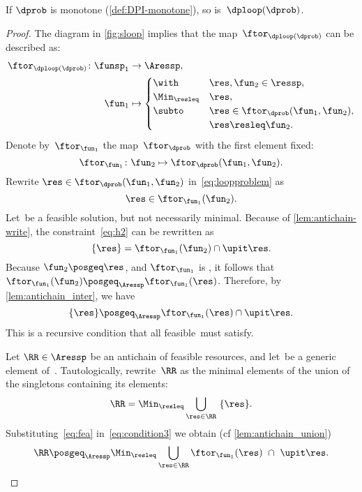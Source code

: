 \begin{proposition}
  \label{pro:loop-continuous}If $\dprob$ is monotone (\cref{def:DPI-monotone}),
  so is~$\dploop(\dprob)$.
\end{proposition}
\begin{proof}
  The diagram in \cref{fig:sloop} implies that the map~$\ftor_{\dploop(\dprob)}$
  can be described as:
  \begin{align}
    \ftor_{\dploop(\dprob)}\colon\funsp_{1} & \rightarrow\Aressp,\label{eq:loopproblem}\\
    \fun_{1} & \mapsto\begin{cases}
                        \with & \res,\fun_{2}\in\ressp,\\
                        \Min_{\resleq} & \res,\\
                        \subto & \res\in\ftor_{\dprob}(\fun_{1},\fun_{2}),\\
                        & \res\resleq\fun_{2}.
    \end{cases}
  \end{align}
  Denote by~$\ftor_{\fun_{1}}$ the map~$\ftor_{\dprob}$ with the
  first element fixed:
  \[
    \ftor_{\fun_{1}}\colon\fun_{2}\mapsto\ftor_{\dprob}(\fun_{1},\fun_{2}).
  \]
  Rewrite $\res\in\ftor_{\dprob}(\fun_{1},\fun_{2})$ in~\cref{eq:loopproblem}
  as
  \begin{equation}
    \res\in\ftor_{\fun_{1}}(\fun_{2}).\label{eq:h2}
  \end{equation}
  Let~\res be a feasible solution, but not necessarily minimal.
  Because of \cref{lem:antichain-write}, the constraint~\cref{eq:h2} can
  be rewritten as
  \begin{equation}
    \{\res\}=\ftor_{\fun_{1}}(\fun_{2})\cap\upit\res.\label{eq:h3}
  \end{equation}
  Because $\fun_{2}\posgeq\res$, and $\ftor_{\fun_{1}}$ is \scottcontinuous,
  it follows that~$\ftor_{\fun_{1}}(\fun_{2})\posgeq_{\Aressp}\ftor_{\fun_{1}}(\res)$.
  Therefore, by \cref{lem:antichain_inter}, we have
  \begin{equation}
    \{\res\}\posgeq_{\Aressp}\ftor_{\fun_{1}}(\res)\cap\upit\res.\label{eq:fea}
  \end{equation}
  This is a recursive condition that all feasible~\res must satisfy.

  Let $\RR\in\Aressp$ be an antichain of feasible resources, and
  let~\res be a generic element of~\ressp. Tautologically, rewrite~$\RR$
  as the minimal elements of the union of the singletons containing
  its elements:
  \begin{equation}
    \RR=\Min_{\resleq}\bigcup_{\res\in\RR}\ \{\res\}.\label{eq:condition3}
  \end{equation}
  Substituting~\cref{eq:fea} in~\cref{eq:condition3} we obtain (cf
  \cref{lem:antichain_union})
  \begin{equation}
    \RR\posgeq_{\Aressp}\Min_{\resleq}\bigcup_{\res\in\RR}\ftor_{\fun_{1}}(\res)\ \cap\ \upit\res.\label{eq:recursive}
  \end{equation}


\end{proof}
